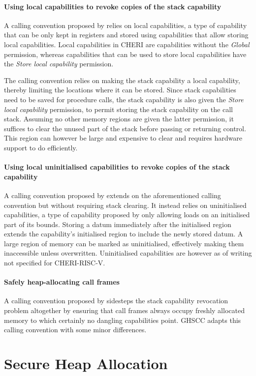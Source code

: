 \documentclass[main.tex]{subfiles}
\begin{document}
\paragraph{Using local capabilities to revoke copies of the stack capability} A calling convention proposed by \cite{retptr} relies on local capabilities, a type of capability that can be only kept in registers and stored using capabilities that allow storing local capabilities. Local capabilities in CHERI are capabilities without the \emph{Global} permission, whereas capabilities that can be used to store local capabilities have the \emph{Store local capability} permission.

The calling convention relies on making the stack capability a local capability, thereby limiting the locations where it can be stored. Since stack capabilities need to be saved for procedure calls, the stack capability is also given the \emph{Store local capability} permission, to permit storing the stack capability on the call stack. Assuming no other memory regions are given the latter permission, it suffices to clear the unused part of the stack before passing or returning control. This region can however be large and expensive to clear and requires hardware support to do efficiently.

\paragraph{Using local uninitialised capabilities to revoke copies of the stack capability} A calling convention proposed by \cite{uninitcaps} extends on the aforementioned calling convention but without requiring stack clearing. It instead relies on uninitialised capabilities, a type of capability proposed by \cite{uninitcapss} only allowing loads on an initialised part of its bounds. Storing a datum immediately after the initialised region extends the capability's initialised region to include the newly stored datum. A large region of memory can be marked as uninitialised, effectively making them inaccessible unless overwritten. Uninitialised capabilities are however as of writing not specified for CHERI-RISC-V.

\paragraph{Safely heap-allocating call frames} A calling convention proposed by \cite{cerise} sidesteps the stack capability revocation problem altogether by ensuring that call frames always occupy freshly allocated memory to which certainly no dangling capabilities point. GHSCC adapts this calling convention with some minor differences.

\section{Secure Heap Allocation}


\biblio{}
\onlyinsubfile{\glsaddall\printglossaries}
\end{document}

